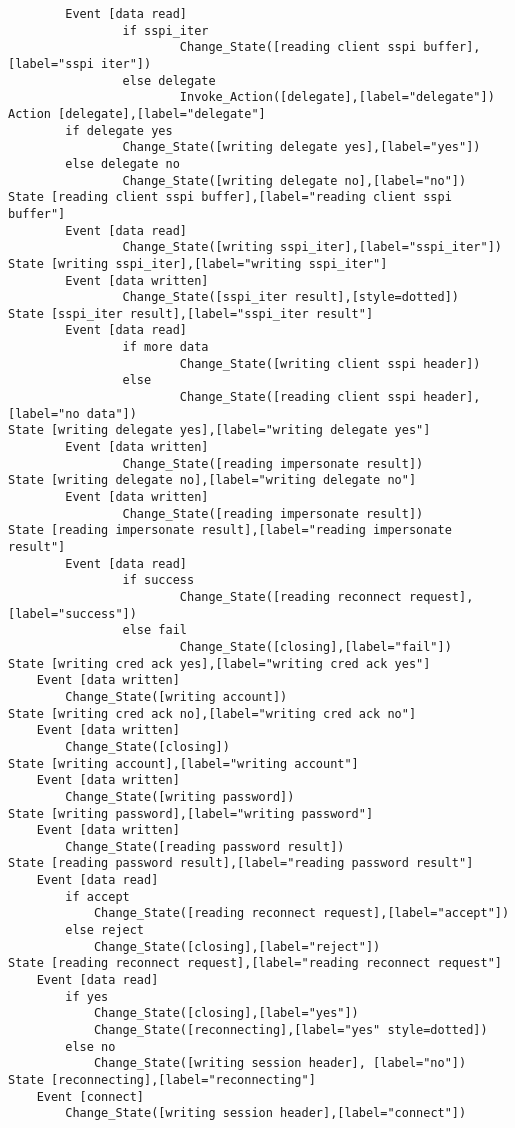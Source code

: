 \begin{verbatim}
        Event [data read]
                if sspi_iter
                        Change_State([reading client sspi buffer],[label="sspi iter"])
                else delegate
                        Invoke_Action([delegate],[label="delegate"])
Action [delegate],[label="delegate"]
        if delegate yes
                Change_State([writing delegate yes],[label="yes"])
        else delegate no
                Change_State([writing delegate no],[label="no"])
State [reading client sspi buffer],[label="reading client sspi buffer"]
        Event [data read]
                Change_State([writing sspi_iter],[label="sspi_iter"])
State [writing sspi_iter],[label="writing sspi_iter"]
        Event [data written]
                Change_State([sspi_iter result],[style=dotted])
State [sspi_iter result],[label="sspi_iter result"]
        Event [data read]
				if more data
						Change_State([writing client sspi header])
				else
						Change_State([reading client sspi header],[label="no data"])
State [writing delegate yes],[label="writing delegate yes"]
        Event [data written]
                Change_State([reading impersonate result])
State [writing delegate no],[label="writing delegate no"]
        Event [data written]
                Change_State([reading impersonate result])
State [reading impersonate result],[label="reading impersonate result"]
        Event [data read]
                if success
                        Change_State([reading reconnect request],[label="success"])
                else fail
                        Change_State([closing],[label="fail"])
State [writing cred ack yes],[label="writing cred ack yes"]
	Event [data written]
		Change_State([writing account])
State [writing cred ack no],[label="writing cred ack no"]
	Event [data written]
		Change_State([closing])
State [writing account],[label="writing account"]
	Event [data written]
		Change_State([writing password])
State [writing password],[label="writing password"]
	Event [data written]
		Change_State([reading password result])
State [reading password result],[label="reading password result"]
	Event [data read]
		if accept
			Change_State([reading reconnect request],[label="accept"])
		else reject
			Change_State([closing],[label="reject"])
State [reading reconnect request],[label="reading reconnect request"]
	Event [data read]
		if yes
			Change_State([closing],[label="yes"])
			Change_State([reconnecting],[label="yes" style=dotted])
		else no
			Change_State([writing session header], [label="no"])
State [reconnecting],[label="reconnecting"]
	Event [connect]
		Change_State([writing session header],[label="connect"])

\end{verbatim}
